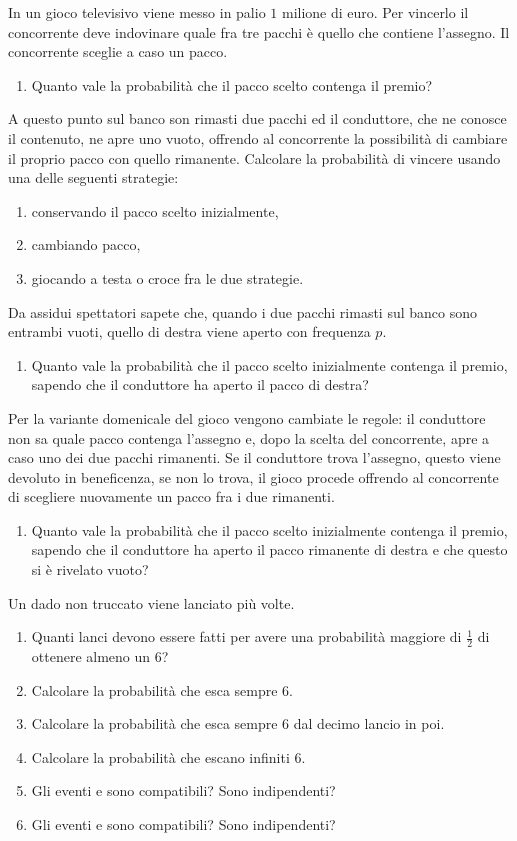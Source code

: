 In un gioco televisivo viene messo in palio $1$ milione di euro. Per vincerlo il concorrente deve indovinare quale fra tre pacchi è quello che contiene l'assegno. Il concorrente sceglie a caso un pacco.
\begin{enumerate}
	\item Quanto vale la probabilità che il pacco scelto contenga il premio?
\end{enumerate}
A questo punto sul banco son rimasti due pacchi ed il conduttore, che ne conosce il contenuto, ne apre uno vuoto, offrendo al concorrente la possibilità di cambiare il proprio pacco con quello rimanente. Calcolare la probabilità di vincere usando una delle seguenti strategie:
\begin{enumerate}
	\item conservando il pacco scelto inizialmente,
	\item cambiando pacco,
	\item giocando a testa o croce fra le due strategie.
\end{enumerate}
Da assidui spettatori sapete che, quando i due pacchi rimasti sul banco sono entrambi vuoti, quello di destra viene aperto con frequenza $p$.
\begin{enumerate}
	\item Quanto vale la probabilità che il pacco scelto inizialmente contenga il premio, sapendo che il conduttore ha aperto il pacco di destra?
\end{enumerate}
Per la variante domenicale del gioco vengono cambiate le regole: il conduttore non sa quale pacco contenga l'assegno e, dopo la scelta del concorrente, apre a caso uno dei due pacchi rimanenti. Se il conduttore trova l'assegno, questo viene devoluto in beneficenza, se non lo trova, il gioco procede offrendo al concorrente di scegliere nuovamente un pacco fra i due rimanenti.
\begin{enumerate}
	\item Quanto vale la probabilità che il pacco scelto inizialmente contenga il premio, sapendo che il conduttore ha aperto il pacco rimanente di destra e che questo si è rivelato vuoto?
\end{enumerate}


Un dado non truccato viene lanciato più volte.
\begin{enumerate}
	\item Quanti lanci devono essere fatti per avere una probabilità maggiore di $\frac{1}{2}$ di ottenere almeno un $6$?
	\item Calcolare la probabilità che esca sempre $6$.
	\item Calcolare la probabilità che esca sempre $6$ dal decimo lancio in poi.
	\item Calcolare la probabilità che escano infiniti $6$.
	\item Gli eventi  e  sono compatibili? Sono indipendenti?
	\item Gli eventi  e  sono compatibili? Sono indipendenti?
\end{enumerate}

